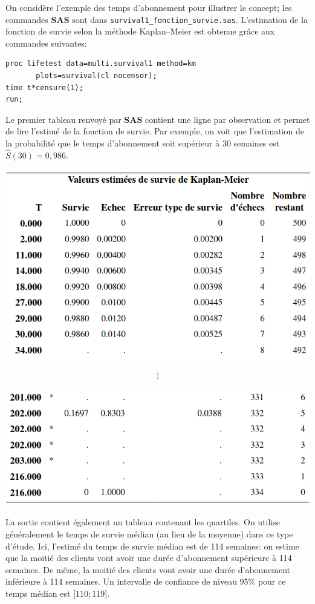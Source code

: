 \documentclass[
  11pt,
  letterpaper,
]{book}
\theoremstyle{definition}
\theoremstyle{definition}
\theoremstyle{definition}
\theoremstyle{remark}
\begin{document}
On considère l'exemple des temps d'abonnement pour illustrer le concept; les commandes \textbf{SAS} sont dans \texttt{survival1\_fonction\_survie.sas}. L'estimation de la fonction de survie selon la méthode Kaplan--Meier est obtenue grâce aux commandes suivantes:

\begin{verbatim}
proc lifetest data=multi.survival1 method=km
       plots=survival(cl nocensor);
time t*censure(1);
run;
\end{verbatim}

Le premier tableau renvoyé par \textbf{SAS} contient une ligne par observation et permet de lire l'estimé de la fonction de survie. Par exemple, on voit que l'estimation de la probabilité que le temps d'abonnement soit supérieur à 30 semaines est \(\widehat{S}(30)=0,986\).

\begin{center}\includegraphics[width=0.7\linewidth]{figures/05-survie-e1} \end{center}

\begin{align*} \vdots \end{align*}

\begin{center}\includegraphics[width=0.7\linewidth]{figures/05-survie-e2} \end{center}

La sortie contient également un tableau contenant les quartiles. On utilise généralement le temps de survie médian (au lieu de la moyenne) dans ce type d'étude. Ici, l'estimé du temps de survie médian est de 114 semaines: on estime que la moitié des clients vont avoir une durée d'abonnement supérieure à 114 semaines. De même, la moitié des clients vont avoir une durée d'abonnement inférieure à 114 semaines. Un intervalle de confiance de niveau 95\% pour ce temps médian est {[}\(110; 119\){]}.
\end{document}
